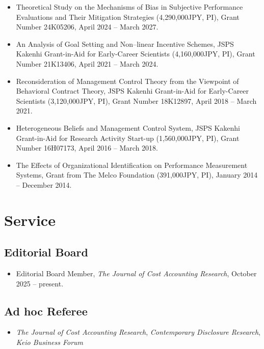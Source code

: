 \documentclass[letterpaper,11pt]{article}
\begin{document}
\begin{itemize}
\item Theoretical Study on the Mechanisms of Bias in Subjective Performance Evaluations and Their Mitigation Strategies (4,290,000JPY, PI), Grant Number 24K05206, April 2024 -- March 2027.

\item An Analysis of Goal Setting and Non--linear Incentive Schemes, JSPS Kakenhi Grant-in-Aid for Early-Career Scientists (4,160,000JPY, PI), Grant Number 21K13406, April 2021 -- March 2024.

\item Reconsideration of Management Control Theory from the Viewpoint of Behavioral Contract Theory, JSPS Kakenhi Grant-in-Aid for Early-Career Scientists (3,120,000JPY, PI), Grant Number 18K12897, April 2018 -- March 2021.

\item Heterogeneous Beliefs and Management Control System, JSPS Kakenhi Grant-in-Aid for Research Activity Start-up (1,560,000JPY, PI), Grant Number 16H07173, April 2016 -- March 2018.

\item The Effects of Organizational Identification on Performance Measurement Systems, Grant from The Melco Foundation (391,000JPY, PI), January 2014 -- December 2014.
\end{itemize}

\section*{Service}

\subsection*{Editorial Board}

\begin{itemize}
\item Editorial Board Member, \textit{The Journal of Cost Accounting Research}, October 2025 -- present.
\end{itemize}

\subsection*{Ad hoc Referee}

\begin{itemize}
\item \textit{The Journal of Cost Accounting Research}, \textit{Contemporary Disclosure Research}, \textit{Keio Business Forum}
\end{itemize}
\end{document}
